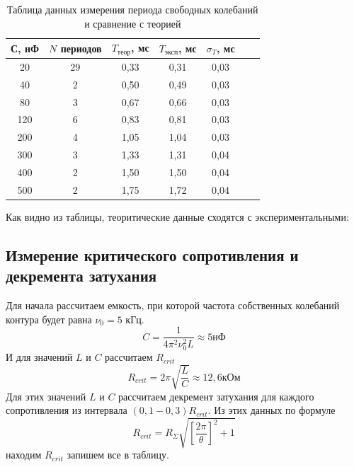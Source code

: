 \documentclass[a4paper, 12pt]{article}%
\begin{document}
\begin{table}[h!]
\begin{center}
\begin{tabular}{|c|c|c|c|c|c|c|}
\hline
С, нФ & $N$ периодов & $T_{\text{теор}}$, мс & $T_{\text{эксп}}$, мс & $\sigma_T$, мс \\ \hline
20               & 29        & 0,33           & 0,31            & 0,03           \\ \hline
40               & 2         & 0,50           & 0,49            & 0,03           \\ \hline
80               & 3         & 0,67           & 0,66            & 0,03           \\ \hline
120              & 6         & 0,83           & 0,81            & 0,03           \\ \hline
200              & 4         & 1,05           & 1,04            & 0,03           \\ \hline
300              & 3         & 1,33           & 1,31            & 0,04           \\ \hline
400              & 2         & 1,50           & 1,50            & 0,04           \\ \hline
500              & 2         & 1,75           & 1,72            & 0,04           \\ \hline
\end{tabular}
\caption{Таблица данных измерения периода свободных колебаний и сравнение с теорией}
\end{center}
\end{table}

Как видно из таблицы, теоритические данные сходятся с экспериментальными:

\subsection{Измерение критического сопротивления и декремента затухания}

Для начала рассчитаем емкость, при которой частота собственных колебаний контура будет равна $\nu_0 = 5$ кГц.
\[C = \dfrac{1}{4 \pi^2 \nu_0^2 L} \approx 5 \text{нФ}\]
И для значений $L$ и $C$ рассчитаем $R_{crit}$
\[R_{crit} = 2\pi\sqrt{\dfrac{L}{C}} \approx 12,6 \text{кОм}\]
Для этих значений $L$ и $C$ рассчитаем декремент затухания для каждого сопротивления из интервала $(0,1-0,3)R_{crit}$. Из этих данных по формуле 
\[R_{crit} = R_{\Sigma} \sqrt{\left[\dfrac{2\pi}{\theta}\right]^2 + 1}\]
находим $R_{crit}$ запишем все в таблицу. 
\end{document}
